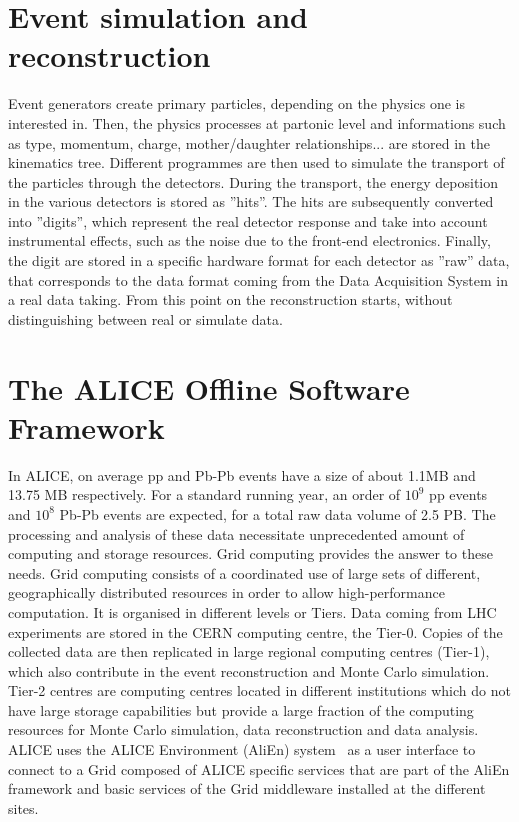 \section{Event simulation and reconstruction}
Event generators create primary particles, depending on the physics one is interested in. 
Then, the physics processes at partonic level and informations such as type, momentum, 
charge, mother/daughter relationships... are stored in the kinematics tree. Different
 programmes are then used to simulate the transport of the particles through the
  detectors. During the transport, the energy deposition in the various detectors is stored 
  as ''hits''. The hits are subsequently converted into ''digits'', which represent 
  the real detector response and take into account instrumental effects, such as the noise 
  due to the front-end electronics. Finally, the digit are stored in a specific hardware format 
  for each detector as ''raw'' data, that corresponds to the data format coming from the 
  Data Acquisition System in a real data taking. From this point on the reconstruction starts, 
  without distinguishing between real or simulate data. 


\section{The ALICE Offline Software Framework}
In ALICE, on average pp and Pb-Pb events have a size of about 1.1MB and 13.75 MB respectively. 
For a standard running year, an order of $10^9$ pp events and $10^8$ Pb-Pb events are expected, for a total 
raw data volume of 2.5 PB. The processing and analysis of these data necessitate 
unprecedented amount of computing and storage resources. Grid computing provides 
the answer to these needs. Grid computing consists of a coordinated use of large sets 
of different, geographically distributed resources in order to allow high-performance 
computation. It is organised in different levels or Tiers. Data coming from LHC experiments 
are stored in the CERN computing centre, the Tier-0. Copies of the collected data are then 
replicated in large regional computing centres (Tier-1), which also contribute in the event 
reconstruction and Monte Carlo simulation. Tier-2 centres are computing centres located
 in different institutions which do not have large storage capabilities but provide a large 
 fraction of the computing resources for Monte Carlo simulation, data reconstruction and 
 data analysis. ALICE uses the ALICE Environment (AliEn) system~\cite{Saiz:2003wi} as a 
 user interface to connect to a Grid composed of ALICE specific services that are part 
 of the AliEn framework and basic services of the Grid middleware installed at the different sites.

